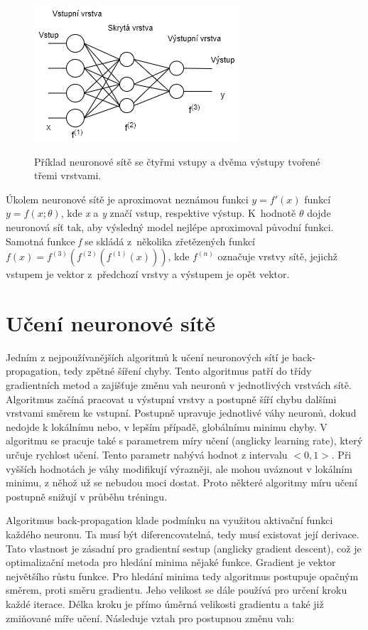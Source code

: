 \begin{figure}[h]\centering
    \centering
    \includegraphics[width=0.6\linewidth]{obrazky/NNSchema.png}\\[1pt]  
    \caption{Příklad neuronové sítě se čtyřmi vstupy a dvěma výstupy tvořené třemi vrstvami. }    
    \label{obrazekSchemaNeuronoveSite}
\end{figure}

Úkolem neuronové sítě je aproximovat neznámou funkci $ y=f'(x)$
funkcí $ y=f(x;\theta )$, kde \emph{x} a \emph{y} značí vstup, 
respektive výstup.
K~hodnotě $\theta$ dojde neuronová síť tak,
aby výsledný model nejlépe aproximoval původní funkci.
Samotná funkce \emph{f} se skládá z~několika zřetězených funkcí 
$f(x)=f^{(3)}(f^{(2)}(f^{(1)}(x)))$,
kde $f^{(n)}$ označuje vrstvy sítě, 
jejichž vstupem je vektor z~předchozí vrstvy 
a výstupem je opět vektor.
\par


\section{Učení neuronové sítě}
Jedním z nejpoužívanějších algoritmů k učení neuronových sítí
je back-propagation, tedy zpětné šíření chyby.
Tento algoritmus patří do třídy gradientních metod
a zajišťuje změnu vah neuronů v jednotlivých vrstvách sítě.
Algoritmus začíná pracovat u výstupní vrstvy
a postupně šíří chybu dalšími vrstvami směrem ke vstupní.
Postupně upravuje jednotlivé váhy neuronů,
dokud nedojde k lokálnímu nebo, 
v lepším případě, globálnímu minimu chyby.
V algoritmu se pracuje také s parametrem míry učení (anglicky learning rate), který určuje rychlost učení.
Tento parametr nabývá hodnot z intervalu $<0,1>$.
Při vyšších hodnotách je váhy modifikují výrazněji,
ale mohou uváznout v lokálním minimu, z něhož už se nebudou moci dostat.
Proto některé algoritmy míru učení postupně snižují v průběhu tréningu.
\par

Algoritmus back-propagation klade podmínku na využitou aktivační funkci každého neuronu.
Ta musí být diferencovatelná, tedy musí existovat její derivace.
Tato vlastnost je zásadní pro gradientní sestup (anglicky gradient descent),
což je optimalizační metoda pro hledání minima nějaké funkce.
Gradient je vektor největšího růstu funkce.
Pro hledání minima tedy algoritmus postupuje opačným směrem,
proti směru gradientu.
Jeho velikost se dále používá pro určení kroku každé iterace.
Délka kroku je přímo úměrná velikosti gradientu 
a také již zmiňované míře učení.
Následuje vztah pro postupnou změnu vah:

